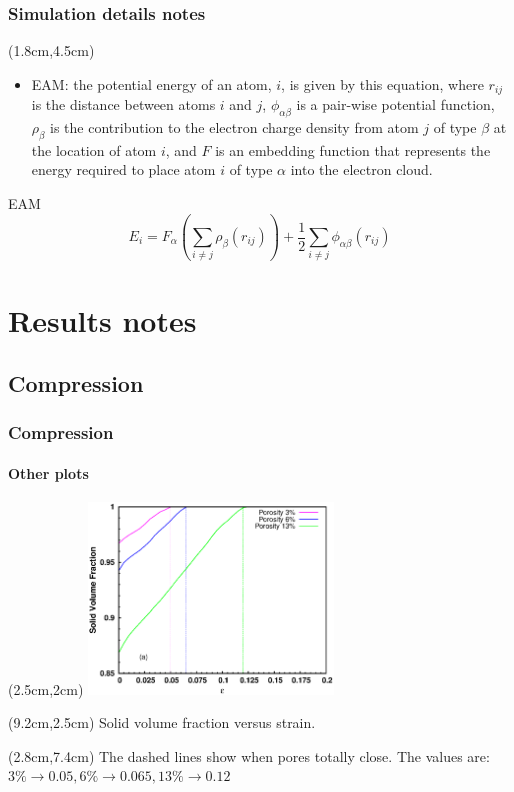 \documentclass[12pt,t]{beamer}
\begin{document}
\begin{frame}
\frametitle{Simulation details notes}
\vspace{-0.3cm}
 \begin{textblock*}{10.6cm}(1.8cm,4.5cm) 
\begin{itemize}
 \item EAM: the potential energy of an atom, $i$, is given by this equation, where $r_{ij}$ is the distance between atoms $i$ and $j$, $\phi_{\alpha\beta}$ is a pair-wise potential function, $\rho_\beta$ is the contribution to the electron charge density from atom $j$ of type $\beta$ at the location of atom $i$, and $F$ is an embedding function that represents the energy required to place atom $i$ of type $\alpha$ into the electron cloud.
\end{itemize}
\end{textblock*}
	\begin{exampleblock}{EAM}
	\[
		E_i=F_{\alpha} \left ( \sum \limits_{i\neq j} \rho _{\beta} (r_{ij}) \right ) + \frac{1}{2} \sum \limits_{i\neq j} \phi _{\alpha \beta} (r_{ij})
	\]
	\end{exampleblock}
\end{frame}


\section{Results notes}

\subsection{Compression}

\begin{frame}
\frametitle{Compression}
\framesubtitle{Other plots}
  \begin{textblock*}{6.5cm}(2.5cm,2cm) %
  \includegraphics[width=6.5cm]{SVF_strain_comp_dash.eps}
  \end{textblock*}
\begin{textblock*}{3cm}(9.2cm,2.5cm) %
  Solid volume fraction versus strain.
\end{textblock*}
\begin{textblock*}{9cm}(2.8cm,7.4cm) %
  The dashed lines show when pores totally close. The values are: \\
  $3\% \rightarrow 0.05, 6\% \rightarrow 0.065, 13\% \rightarrow 0.12$
\end{textblock*}
\end{frame}
\end{document}
